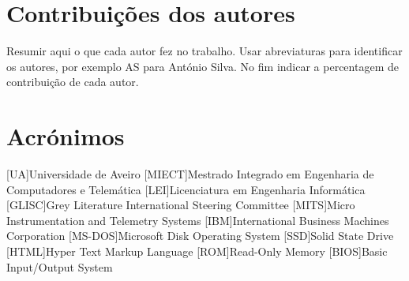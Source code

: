 \documentclass{report}
\begin{document}
\chapter*{Contribuições dos autores}
Resumir aqui o que cada autor fez no trabalho.
Usar abreviaturas para identificar os autores,
por exemplo AS para António Silva.
No fim indicar a percentagem de contribuição de cada autor.

\chapter*{Acrónimos}
\begin{acronym}
[UA]{Universidade de Aveiro}
[MIECT]{Mestrado Integrado em Engenharia de Computadores e Telemática}
[LEI]{Licenciatura em Engenharia Informática}
[GLISC]{Grey Literature International Steering Committee}
[MITS]{Micro Instrumentation and Telemetry Systems}
[IBM]{International Business Machines Corporation}
[MS-DOS]{Microsoft Disk Operating System}
[SSD]{Solid State Drive}
[HTML]{Hyper Text Markup Language}
[ROM]{Read-Only Memory}
[BIOS]{Basic Input/Output System}
\end{acronym}


\printbibliography
\end{document}
